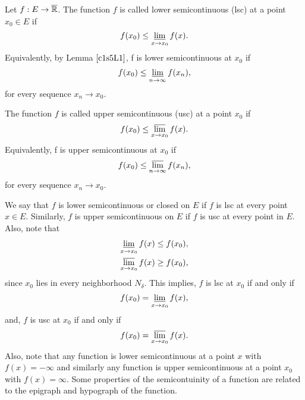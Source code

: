     \begin{definition}
        Let $f: E \to \overline{\mathbb{R}}$. The function $f$ is called lower 
        semicontinuous  
        (lsc) at a point $x_0 \in E$ if 
        \begin{equation*}
            f(x_0) \leq \varliminf_{x \to x_0} f(x).
        \end{equation*}
        Equivalently, by Lemma $\eqref{c1s5L1}$, f is lower semicontinuous at
        $x_0$ if
        \begin{equation*}
            f(x_0) \leq \varliminf_{n \to \infty} f(x_n),
        \end{equation*}
        for every sequence $x_n \to x_0$.
    \end{definition}
    
    \begin{definition}
        The function $f$ is called upper semicontinuous (usc) at a point $x_0$ 
        if
        \begin{equation*}
            f(x_0) \leq \varlimsup_{x \to x_0} f(x).
        \end{equation*}
        Equivalently, f is upper semicontinuous at $x_0$ if
        \begin{equation*}
            f(x_0) \leq \varlimsup_{n \to \infty} f(x_n),
        \end{equation*}
        for every sequence $x_n \to x_0$.
    \end{definition}
    
    We say that $f$ is lower semicontinuous or closed on $E$ if $f$ is lsc
    at every point $x \in E$. Similarly, $f$ is upper semicontinuous on $E$ 
    if $f$ is usc at every point in $E$. Also, note that 
    \begin{align*}
        \varliminf_{x \to x_0} f(x) &\leq f(x_0), \\
        \varlimsup_{x \to x_0} f(x) &\geq f(x_0),
    \end{align*}
    since $x_0$ lies in every neighborhood $N_{\delta}$. This implies, $f$ is 
    lsc
    at $x_0$ if and only if
    $$
        f(x_0) = \varliminf_{x \to x_0} f(x),
    $$
    and, $f$ is usc at $x_0$ if and only if
    $$
        f(x_0) = \varlimsup_{x \to x_0} f(x).
    $$
    Also, note that any function is lower semicontinuous at a point $x$ with
    $f(x) = - \infty$ and similarly any function is upper semicontinuous at a 
    point $x_0$ with $f(x) = \infty$. 
    Some properties of the semicontuinity of a function are related to the
    epigraph and hypograph of the function.
    
